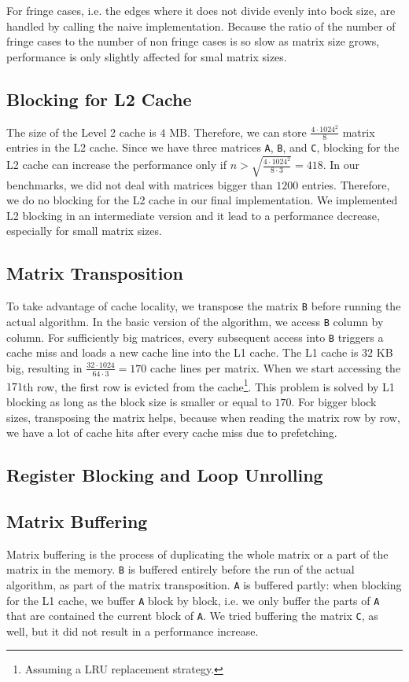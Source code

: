 \documentclass[12pt]{article}
\begin{document}
For fringe cases, i.e. the edges where it does not divide evenly into bock size, are handled by calling the naive implementation. Because the ratio of the number of fringe cases to the number of non fringe cases is so slow as matrix size grows, performance is only slightly affected for smal matrix sizes.



\subsection{Blocking for L2 Cache}
The size of the Level 2 cache is $4$ MB. Therefore, we can store $\frac{4 \cdot 1024^2}{8}$ matrix entries in the L2 cache. Since we have three matrices \lstinline{A}, \lstinline{B}, and \lstinline{C}, blocking for the L2 cache can increase the performance only if $n > \sqrt{\frac{4 \cdot 1024^2}{8 \cdot 3}} = 418$. In our benchmarks, we did not deal with matrices bigger than $1200$ entries. Therefore, we do no blocking for the L2 cache in our final implementation. We implemented L2 blocking in an intermediate version and it lead to a performance decrease, especially for small matrix sizes.

\subsection{Matrix Transposition}
To take advantage of cache locality, we transpose the matrix \lstinline{B} before running the actual algorithm. In the basic version of the algorithm, we access \lstinline{B} column by column. For sufficiently big matrices, every subsequent access into \lstinline{B} triggers a cache miss and loads a new cache line into the L1 cache. The L1 cache is $32$ KB big, resulting in $\frac{32 \cdot 1024}{64 \cdot 3} = 170$ cache lines per matrix. When we start accessing the $171$th row, the first row is evicted from the cache\footnote{Assuming a LRU replacement strategy.}. This problem is solved by L1 blocking as long as the block size is smaller or equal to $170$. For bigger block sizes, transposing the matrix helps, because when reading the matrix row by row, we have a lot of cache hits after every cache miss due to prefetching. 

\subsection{Register Blocking and Loop Unrolling}

\subsection{Matrix Buffering}
Matrix buffering is the process of duplicating the whole matrix or a part of the matrix in the memory. \lstinline{B} is buffered entirely before the run of the actual algorithm, as part of the matrix transposition. \lstinline{A} is buffered partly: when blocking for the L1 cache, we buffer \lstinline{A} block by block, i.e. we only buffer the parts of \lstinline{A} that are contained the current block of \lstinline{A}. We tried buffering the matrix \lstinline{C}, as well, but it did not result in a performance increase. 
\end{document}

